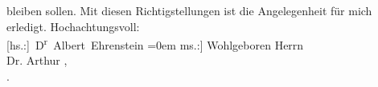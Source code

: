                     bleiben sollen.\pend
           \pstart
           Mit diesen Richtigstellungen ist die Angelegenheit für mich erledigt.\pend
           \pstart
           Hochachtungsvoll:{\\[\baselineskip]}\spacefill\mbox{{[}hs.:{]} D\textsuperscript{r} Albert Ehrenstein}\pend
           \leftskip=0em{}\pstart
           \noindent{}{[}ms.:{]} Wohlgeboren Herrn{\\}Dr. Arthur ,{\\}\textcolor{pink}{}{}\ledrightnote{\textcolor{pink}{Wien}}.\pend
           \endnumbering{}  
      